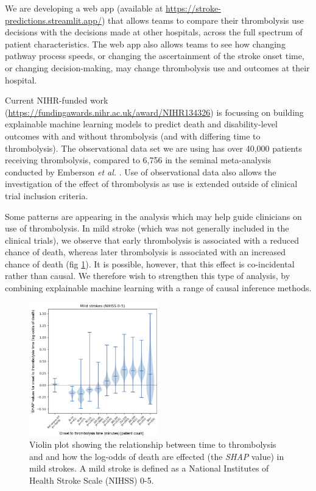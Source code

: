 We are developing a web app (available at \url{https://stroke-predictions.streamlit.app/}) that allows teams to compare their thrombolysis use decisions with the decisions made at other hospitals, across the full spectrum of patient characteristics. The web app also allows teams to see how changing pathway process speeds, or changing the ascertainment of the stroke onset time, or changing decision-making, may change thrombolysis use and outcomes at their hospital.


Current NIHR-funded work (\url{https://fundingawards.nihr.ac.uk/award/NIHR134326}) is focussing on building explainable machine learning models to predict death and disability-level outcomes with and without thrombolysis (and with differing time to thrombolysis). The observational data set we are using has over 40,000 patients receiving thrombolysis, compared to 6,756 in the seminal meta-analysis conducted by Emberson \textit{et al.} \cite{emberson_effect_2014}. Use of observational data also allows the investigation of the effect of thrombolysis as use is extended outside of clinical trial inclusion criteria. 

Some patterns are appearing in the analysis which may help guide clinicians on use of thrombolysis. In mild stroke (which was not generally included in the clinical trials), we observe that early thrombolysis is associated with a reduced chance of death, whereas later thrombolysis is associated with an increased chance of death (fig \ref{fig:death}). It is possible, however, that this effect is co-incidental rather than causal. We therefore wish to strengthen this type of analysis, by combining explainable machine learning with a range of causal inference methods.

\begin{figure}
\centering
\includegraphics[width=0.5\textwidth]{./images/fig_2_}
\caption{Violin plot showing the relationship between time to thrombolysis and and how the log-odds of death are effected (the \textit{SHAP} value) in mild strokes. A mild stroke is defined as a National Institutes of Health Stroke Scale (NIHSS) 0-5.}
\label{fig:death}
\end{figure}

